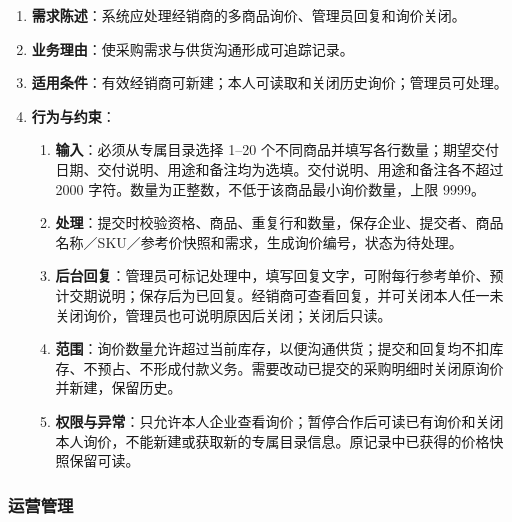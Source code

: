 \begin{enumerate}
\item {\bfseries 需求陈述}：系统应处理经销商的多商品询价、管理员回复和询价关闭。
\item {\bfseries 业务理由}：使采购需求与供货沟通形成可追踪记录。
\item {\bfseries 适用条件}：有效经销商可新建；本人可读取和关闭历史询价；管理员可处理。
\item {\bfseries 行为与约束}：
\begin{enumerate}
\item {\bfseries 输入}：必须从专属目录选择 1--20 个不同商品并填写各行数量；期望交付日期、交付说明、用途和备注均为选填。交付说明、用途和备注各不超过 2000 字符。数量为正整数，不低于该商品最小询价数量，上限 9999。
\item {\bfseries 处理}：提交时校验资格、商品、重复行和数量，保存企业、提交者、商品名称／SKU／参考价快照和需求，生成询价编号，状态为待处理。
\item {\bfseries 后台回复}：管理员可标记处理中，填写回复文字，可附每行参考单价、预计交期说明；保存后为已回复。经销商可查看回复，并可关闭本人任一未关闭询价，管理员也可说明原因后关闭；关闭后只读。
\item {\bfseries 范围}：询价数量允许超过当前库存，以便沟通供货；提交和回复均不扣库存、不预占、不形成付款义务。需要改动已提交的采购明细时关闭原询价并新建，保留历史。
\item {\bfseries 权限与异常}：只允许本人企业查看询价；暂停合作后可读已有询价和关闭本人询价，不能新建或获取新的专属目录信息。原记录中已获得的价格快照保留可读。
\end{enumerate}

\end{enumerate}

\subsubsection{运营管理}\label{sec:326-运营管理}


